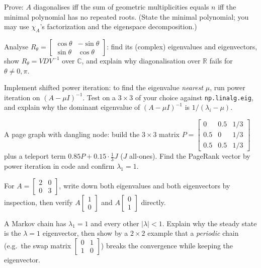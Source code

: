 \begin{exercise}[hard]
Prove: $A$ diagonalises iff the sum of geometric multiplicities equals
$n$ iff the minimal polynomial has no repeated roots. (State the minimal
polynomial; you may use $\chi_A$'s factorization and the eigenspace
decomposition.)
\end{exercise}

\begin{exercise}[hard]
Analyse $R_\theta=\begin{bmatrix}\cos\theta&-\sin\theta\\\sin\theta&\cos\theta\end{bmatrix}$:
find its (complex) eigenvalues and eigenvectors, show
$R_\theta=VDV^{-1}$ over $\mathbb C$, and explain why diagonalisation over
$\mathbb R$ fails for $\theta\ne0,\pi$.
\end{exercise}

\begin{exercise}[hard]
Implement shifted power iteration: to find the eigenvalue \emph{nearest}
$\mu$, run power iteration on $(A-\mu I)^{-1}$. Test on a $3\times3$ of
your choice against \texttt{np.linalg.eig}, and explain why the dominant
eigenvalue of $(A-\mu I)^{-1}$ is $1/(\lambda_i-\mu)$.
\end{exercise}

\begin{exercise}[hard]
A page graph with dangling node: build the $3\times3$ matrix
$P=\begin{bmatrix}0&0.5&1/3\\0.5&0&1/3\\0.5&0.5&1/3\end{bmatrix}$ plus a
teleport term $0.85P+0.15\cdot\frac13J$ ($J$ all-ones). Find the PageRank
vector by power iteration in code and confirm $\lambda_1=1$.
\end{exercise}
\begin{exercise}[easy]
For $A=\begin{bmatrix}2&0\\0&3\end{bmatrix}$, write down both
eigenvalues and both eigenvectors by inspection, then verify
$A\begin{bmatrix}1\\0\end{bmatrix}$ and
$A\begin{bmatrix}0\\1\end{bmatrix}$ directly.
\end{exercise}
\begin{exercise}[hard]
A Markov chain has $\lambda_1=1$ and every other $|\lambda|<1$.
Explain why the steady state is the $\lambda=1$ eigenvector, then show
by a $2\times2$ example that a \emph{periodic} chain (e.g.\ the swap
matrix $\begin{bmatrix}0&1\\1&0\end{bmatrix}$) breaks the convergence
while keeping the eigenvector.
\end{exercise}

